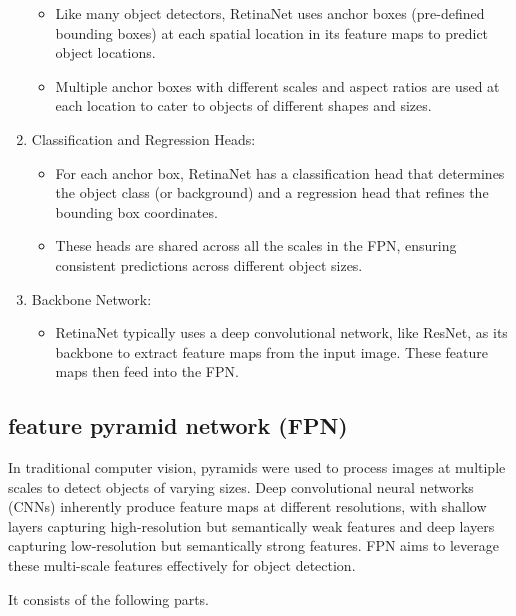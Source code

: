 \documentclass{article}
\begin{document}
\begin{enumerate}
\begin{itemize}
    \item Like many object detectors, RetinaNet uses anchor boxes (pre-defined bounding boxes) at each spatial location in its feature maps to predict object locations.
    \item Multiple anchor boxes with different scales and aspect ratios are used at each location to cater to objects of different shapes and sizes.
\end{itemize}
  \item Classification and Regression Heads:
  \begin{itemize}
    \item For each anchor box, RetinaNet has a classification head that determines the object class (or background) and a regression head that refines the bounding box coordinates.
    \item These heads are shared across all the scales in the FPN, ensuring consistent predictions across different object sizes.
\end{itemize}
  \item Backbone Network:

  \begin{itemize}
    \item RetinaNet typically uses a deep convolutional network, like ResNet, as its backbone to extract feature maps from the input image. These feature maps then feed into the FPN.
  \end{itemize}
\end{enumerate}

\subsection{feature pyramid network (FPN)}

In traditional computer vision, pyramids were used to process images at multiple scales to detect objects of varying sizes.
Deep convolutional neural networks (CNNs) inherently produce feature maps at different resolutions, with shallow layers capturing high-resolution but semantically weak features and deep layers capturing low-resolution but semantically strong features.
FPN aims to leverage these multi-scale features effectively for object detection.

It consists of the following parts.
\end{document}

